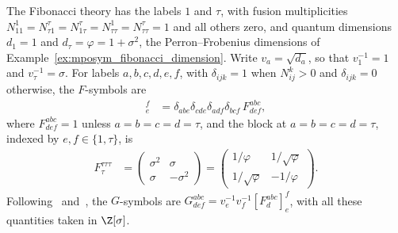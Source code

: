 \begin{definition}
    \label{def:asymex_fib_fsymbols}
    \leanok
    The Fibonacci theory has the labels $1$ and $\tau$, with fusion
    multiplicities
    $N_{11}^1=N_{\tau1}^\tau=N_{1\tau}^\tau=N_{\tau\tau}^1=N_{\tau\tau}^\tau=1$
    and all others zero, and quantum dimensions $d_1=1$ and
    $d_\tau=\varphi=1+\sigma^2$, the Perron--Frobenius dimensions of
    Example~\ref{ex:mposym_fibonacci_dimension}. Write $v_a=\sqrt{d_a}$, so that
    $v_1^{-1}=1$ and $v_\tau^{-1}=\sigma$. For labels $a,b,c,d,e,f$,
    with $\delta_{ijk}=1$ when $N_{ij}^k>0$ and $\delta_{ijk}=0$
    otherwise, the $F$-symbols are
    \begin{align}
        [F^{abc}_d]_e^f
         & =\delta_{abe}\delta_{cde}\delta_{adf}\delta_{bcf}\,F^{abc}_{def},
        \label{eq:asymex_fib_fsymbol}
    \end{align}
    where $F^{abc}_{def}=1$ unless $a=b=c=d=\tau$, and the block at
    $a=b=c=d=\tau$, indexed by $e,f\in\{1,\tau\}$, is
    \begin{align}
        F^{\tau\tau\tau}_\tau
         & =\begin{pmatrix}
                \sigma^2 & \sigma    \\
                \sigma   & -\sigma^2
            \end{pmatrix}
        =\begin{pmatrix}
             1/\varphi      & 1/\sqrt\varphi \\
             1/\sqrt\varphi & -1/\varphi
         \end{pmatrix}.
        \label{eq:asymex_fib_ftau}
    \end{align}
    Following~\cite[Appendix~A, ``The MPO for the Fibonacci model'']{Cirac2021Matrix}
    and~\cite[Appendix~D.1]{Bultinck2017Anyons}, the $G$-symbols are
    $G^{abc}_{def}=v_e^{-1}v_f^{-1}[F^{abc}_d]_e^f$, with all these
    quantities taken in $\Z[\sigma]$.
\end{definition}

